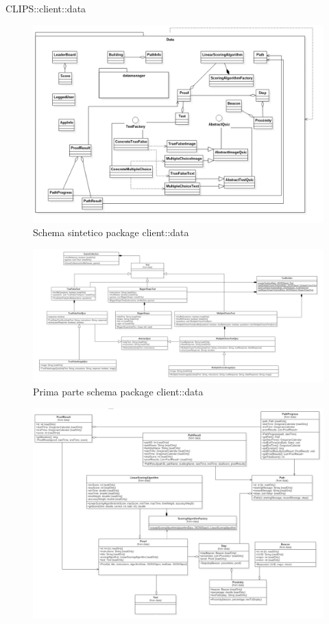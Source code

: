 \begin{componente}{CLIPS::client::data}
\begin{figure}[h!]
	\centering
	\includegraphics[scale=0.35]{img/package/png/client--data--min.png}
	\caption{Schema sintetico package client::data}
\end{figure}
\begin{figure}[h!]
	\centering
	\includegraphics[scale=0.35]{img/package/png/client--data1.png}
	\caption{Prima parte schema package client::data}
\end{figure}
\begin{figure}[h!]
	\centering
	\includegraphics[scale=0.35]{img/package/png/client--data2.png}

\end{figure}
\end{componente}
